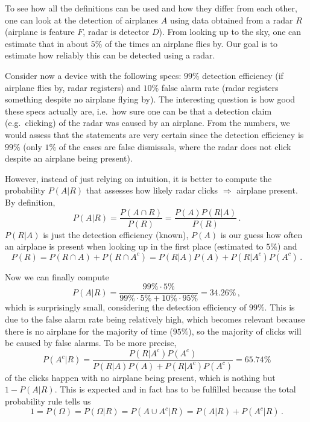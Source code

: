 \begin{ex}[Radar]
To see how all the definitions can be used and how they differ from each other, one can look at the detection of airplanes $A$ using data obtained from a radar $R$ (airplane is feature $F$, radar is detector $D$). From looking up to the sky, one can estimate that in about $5\%$ of the times an airplane flies by. Our goal is to estimate how reliably this can be detected using a radar.


Consider now a device with the following specs: $99\%$ detection efficiency (if airplane flies by, radar registers) and $10\%$ false alarm rate (radar registers something despite no airplane flying by). The interesting question is how good these specs actually are, i.e.~how sure one can be that a detection claim (e.g.~clicking) of the radar was caused by an airplane. From the numbers, we would assess that the statements are very certain since the detection efficiency is $99\%$ (only $1\%$ of the cases are false dismissals, where the radar does not click despite an airplane being present).

However, instead of just relying on intuition, it is better to compute the probability $P(A | R)$ that assesses how likely radar clicks $\Rightarrow$ airplane present. By definition,
\begin{equation*}
P(A | R) = \frac{P(A \cap R)}{P(R)} = \frac{P(A) P(R | A)}{P(R)} \, .
\end{equation*}
$P(R | A)$ is just the detection efficiency (known), $P(A)$ is our guess how often an airplane is present when looking up in the first place (estimated to $5\%$) and%
\begin{equation*}
P(R) = P(R \cap A) + P(R \cap A^c) = P(R | A) P(A) + P(R | A^c) P(A^c) \, .
\end{equation*}

Now we can finally compute
\begin{equation*}
P(A | R) = \frac{99\% \cdot 5\%}{99\% \cdot 5\% + 10\% \cdot 95\%} = 34.26\% \, ,
\end{equation*}
which is surprisingly small, considering the detection efficiency of $99\%$. This is due to the false alarm rate being relatively high, which becomes relevant because there is no airplane for the majority of time ($95\%$), so the majority of clicks will be caused by false alarms. To be more precise,
\begin{equation*}
P(A^c | R) = \frac{P(R | A^c) P(A^c)}{P(R | A) P(A) + P(R | A^c) P(A^c)} = 65.74\%
\end{equation*}
of the clicks happen with no airplane being present, which is nothing but $1 - P(A | R)$. This is expected and in fact has to be fulfilled because the total probability rule tells us
\begin{equation*}
1 = P(\Omega) = P(\Omega | R) = P(A \cup A^c | R) = P(A | R) + P(A^c | R) \, .
\end{equation*}
\end{ex}



